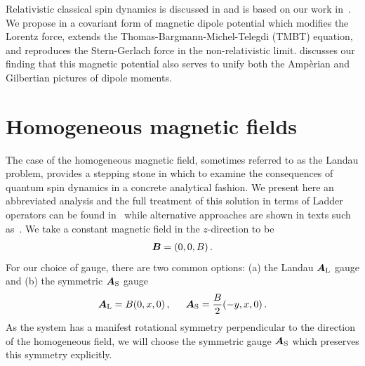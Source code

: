 Relativistic classical spin dynamics is discussed in  and is based on our work in~\cite{Rafelski:2017hce}. We propose in  a covariant form of magnetic dipole potential which modifies the Lorentz force, extends the Thomas-Bargmann-Michel-Telegdi (TMBT) equation, and reproduces the Stern-Gerlach force in the non-relativistic limit.  discusses our finding that this magnetic potential also serves to unify both the Amp{\`e}rian and Gilbertian pictures of dipole moments.

\section{Homogeneous magnetic fields}
\label{sec:homogeneous}
\noindent The case of the homogeneous magnetic field, sometimes referred to as the Landau problem, provides a stepping stone in which to examine the consequences of quantum spin dynamics in a concrete analytical fashion. We present here an abbreviated analysis and the full treatment of this solution in terms of Ladder operators can be found in~\cite{Steinmetz:2018ryf} while alternative approaches are shown in texts such as~\cite{Itzykson:1980rh}. We take a constant magnetic field in the $z$-direction to be
\begin{alignat}{1}
	\label{homogeneous:1} \boldsymbol{B}=(0,0,B)\,.
\end{alignat}
For our choice of gauge, there are two common options: (a) the Landau $\boldsymbol{A}_\mathrm{L}$ gauge and (b) the symmetric $\boldsymbol{A}_\mathrm{S}$ gauge
\begin{alignat}{1}
	\label{homogeneous:2} \bb{A}_\mathrm{L}=B(0,x,0)\,,\indent \bb{A}_\mathrm{S}=\frac{B}{2}(-y,x,0)\,.
\end{alignat}
As the system has a manifest rotational symmetry perpendicular to the direction of the homogeneous field, we will choose the symmetric gauge $\boldsymbol{A}_\mathrm{S}$ which preserves this symmetry explicitly.

